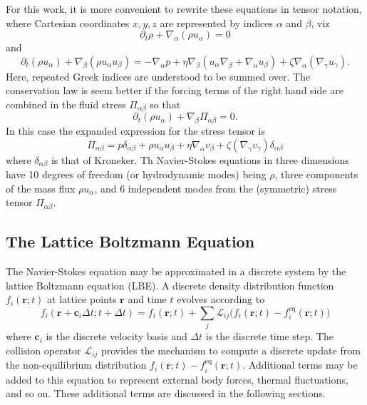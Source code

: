 For this work, it is more convenient to rewrite these equations
in tensor notation, where Cartesian coordinates ${x,y,z}$ are
represented by indices $\alpha$ and $\beta$, viz
\begin{equation}
\partial_t \rho + \nabla_\alpha (\rho u_\alpha) = 0
\end{equation}
and
\begin{equation}
\partial_t (\rho u_\alpha) + \nabla_\beta (\rho u_\alpha u_\beta)
= -\nabla_\alpha p
+  \eta \nabla_\beta (u_\alpha \nabla_\beta + \nabla_\alpha u_\beta)
+ \zeta \nabla_\alpha (\nabla_\gamma u_\gamma).
\end{equation}
Here, repeated Greek indices are understood to be summed over.
The conservation law is seem better if the forcing terms of the
right hand side are combined in the fluid stress $\Pi_{\alpha\beta}$
so that
\begin{equation}
\partial_t (\rho u_\alpha) +\nabla_\beta \Pi_{\alpha\beta} = 0.
\end{equation}
In this case the expanded expression for the stress tensor is
\begin{equation}
\Pi_{\alpha\beta} = p \delta_{\alpha\beta} + \rho u_\alpha u_\beta 
+ \eta \nabla_\alpha v_\beta + \zeta (\nabla_\gamma v_\gamma)\delta_{\alpha\beta}
\end{equation}
where $\delta_{\alpha\beta}$ is that of Kroneker. Th Navier-Stokes
equations in three dimensions have 10 degrees of freedom
(or hydrodynamic modes) being
$\rho$, three components of the mass flux $\rho u_\alpha$, and 6 independent
modes from the (symmetric) stress tensor $\Pi_{\alpha\beta}$.

\subsection{The Lattice Boltzmann Equation}

The Navier-Stokes equation may be approximated in a discrete system
by the lattice Boltzmann equation (LBE). A discrete density
distribution function $f_i(\mathbf{r}; t)$ at lattice points $\mathbf{r}$
and time $t$ evolves according to
\begin{equation}
f_i (\mathbf{r} + \mathbf{c}_i \Delta t; t + \Delta t) =
f_i (\mathbf{r}; t) + \sum_j \mathcal{L}_{ij}
\big( f_i(\mathbf{r};t) - f_i^{\mathrm{eq}}(\mathbf{r};t) \big)
\end{equation}
where $\mathbf{c}_i$ is the discrete velocity basis and $\Delta t$
is the discrete time step. The collision operator
$\mathcal{L}_{ij}$ provides the mechanism to compute a discrete
update from the non-equilibrium distribution
$f_i(\mathbf{r}; t)- f_i^\mathrm{eq}(\mathbf{r};t)$. Additional terms
may be added to this equation to represent external body forces,
thermal fluctuations, and so on. These additional terms are discussed
in the following sections.

